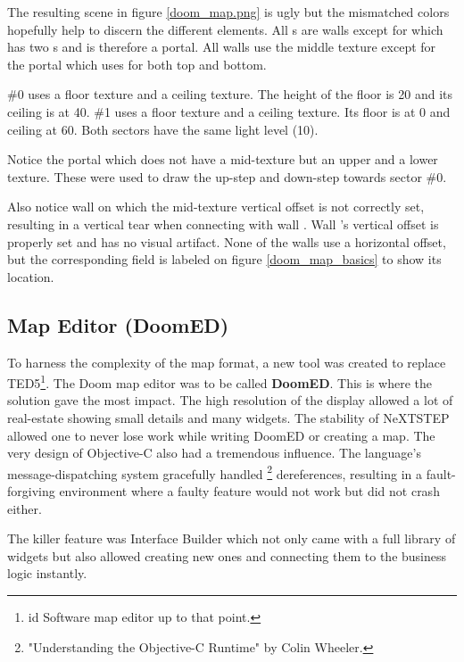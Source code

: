 \par

The resulting scene in figure \ref{doom_map.png} is ugly but the mismatched colors hopefully help to discern the different elements. All s are walls except for  which has two s and is therefore a portal. All walls use the  middle texture except for the portal which uses  for both top and bottom.\\
\par
{} \#0 uses a  floor texture and a  ceiling texture. The height of the floor is 20 and its ceiling is at 40.  \#1 uses a  floor texture and a  ceiling texture. Its floor is at 0 and ceiling at 60. Both sectors have the same light level (10).\\
\par
   Notice the portal  which does not have a mid-texture but an upper and a lower texture. These were used to draw the up-step and down-step towards sector \#0.\\
\par
Also notice wall  on which the mid-texture vertical offset is not correctly set, resulting in a vertical tear when connecting with wall . Wall 's vertical offset is properly set and has no visual artifact. None of the walls use a horizontal offset, but the corresponding field is labeled  on figure \ref{doom_map_basics} to show its location.\\ 
\pagebreak



\subsection{Map Editor (DoomED)}
To harness the complexity of the map format, a new tool was created to replace TED5\footnote{id Software map editor up to that point.}. The Doom map editor was to be called \textbf{DoomED}. This is where the \NeXT solution gave the most impact. The high resolution of the display allowed a lot of real-estate showing small details and many widgets. The stability of NeXTSTEP allowed one to never lose work while writing DoomED or creating a map.
The very design of Objective-C also had a tremendous influence. The language's message-dispatching system gracefully handled \footnote{"Understanding the Objective-C Runtime" by Colin Wheeler.} dereferences, resulting in a fault-forgiving environment where a faulty feature would not work but did not crash either.\\
\par   
The killer feature was Interface Builder which not only came with a full library of widgets but also allowed creating new ones and connecting them to the business logic instantly.\\
\par
{}
\par

